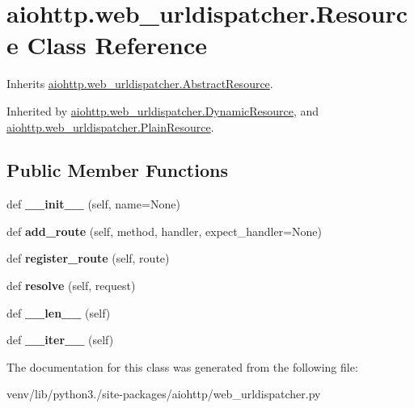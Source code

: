 \hypertarget{classaiohttp_1_1web__urldispatcher_1_1_resource}{}\section{aiohttp.\+web\+\_\+urldispatcher.\+Resource Class Reference}
\label{classaiohttp_1_1web__urldispatcher_1_1_resource}


Inherits \hyperlink{classaiohttp_1_1web__urldispatcher_1_1_abstract_resource}{aiohttp.\+web\+\_\+urldispatcher.\+Abstract\+Resource}.



Inherited by \hyperlink{classaiohttp_1_1web__urldispatcher_1_1_dynamic_resource}{aiohttp.\+web\+\_\+urldispatcher.\+Dynamic\+Resource}, and \hyperlink{classaiohttp_1_1web__urldispatcher_1_1_plain_resource}{aiohttp.\+web\+\_\+urldispatcher.\+Plain\+Resource}.

\subsection*{Public Member Functions}
\begin{DoxyCompactItemize}
\item 
\mbox{\label{classaiohttp_1_1web__urldispatcher_1_1_resource_a71339f8a31f683121ba9fde99c8783e6}} 
def {\bfseries \+\_\+\+\_\+init\+\_\+\+\_\+} (self, name=None)
\item 
\mbox{\label{classaiohttp_1_1web__urldispatcher_1_1_resource_a5ffe0ce73b4420f5029498591e1372aa}} 
def {\bfseries add\+\_\+route} (self, method, handler, expect\+\_\+handler=None)
\item 
\mbox{\label{classaiohttp_1_1web__urldispatcher_1_1_resource_a600320054c82c229a222d6a1613ef853}} 
def {\bfseries register\+\_\+route} (self, route)
\item 
\mbox{\label{classaiohttp_1_1web__urldispatcher_1_1_resource_afe988a16e8b11bb1b1e014380ba4429e}} 
def {\bfseries resolve} (self, request)
\item 
\mbox{\label{classaiohttp_1_1web__urldispatcher_1_1_resource_ad68ccad2db712e8e49b1581c795c4e58}} 
def {\bfseries \+\_\+\+\_\+len\+\_\+\+\_\+} (self)
\item 
\mbox{\label{classaiohttp_1_1web__urldispatcher_1_1_resource_af888b3693bd34fe2b9d6e335e1b71120}} 
def {\bfseries \+\_\+\+\_\+iter\+\_\+\+\_\+} (self)
\end{DoxyCompactItemize}


The documentation for this class was generated from the following file\+:\begin{DoxyCompactItemize}
\item 
venv/lib/python3./site-\/packages/aiohttp/web\+\_\+urldispatcher.\+py\end{DoxyCompactItemize}
